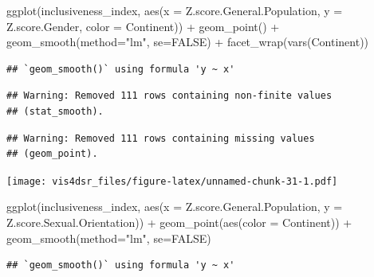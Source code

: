 \documentclass[
]{krantz}
\makeatletter
\newenvironment{Shaded}{\begin{snugshade}}{\end{snugshade}}
\newcommand{\AttributeTok}[1]{\textcolor[rgb]{0.61,0.61,0.61}{#1}}
\newcommand{\ConstantTok}[1]{\textcolor[rgb]{0,0,0}{#1}}
\newcommand{\FunctionTok}[1]{\textcolor[rgb]{0,0,0}{#1}}
\newcommand{\NormalTok}[1]{#1}
\newcommand{\SpecialCharTok}[1]{\textcolor[rgb]{0,0,0}{#1}}
\newcommand{\StringTok}[1]{\textcolor[rgb]{0.5,0.5,0.5}{#1}}
\newenvironment{kframe}{%
\medskip{}
\setlength{\fboxsep}{.8em}
 \def\at@end@of@kframe{}%
 \ifinner\ifhmode%
  \def\at@end@of@kframe{\end{minipage}}%
  \begin{minipage}{\columnwidth}%
 \fi\fi%
 \def\FrameCommand##1{\hskip\@totalleftmargin \hskip-\fboxsep
 \colorbox{shadecolor}{##1}\hskip-\fboxsep
     \hskip-\linewidth \hskip-\@totalleftmargin \hskip\columnwidth}%
 \MakeFramed {\advance\hsize-\width
   \@totalleftmargin\z@ \linewidth\hsize
   \@setminipage}}%
 {\par\unskip\endMakeFramed%
 \at@end@of@kframe}
\renewenvironment{Shaded}{\begin{kframe}}{\end{kframe}}
\makeatother
\begin{document}
\begin{Shaded}
\begin{Highlighting}[]
\FunctionTok{ggplot}\NormalTok{(inclusiveness\_index, }
       \FunctionTok{aes}\NormalTok{(}\AttributeTok{x =}\NormalTok{ Z.score.General.Population, }
           \AttributeTok{y =}\NormalTok{ Z.score.Gender,}
           \AttributeTok{color =}\NormalTok{ Continent)) }\SpecialCharTok{+}
  \FunctionTok{geom\_point}\NormalTok{() }\SpecialCharTok{+}
  \FunctionTok{geom\_smooth}\NormalTok{(}\AttributeTok{method=}\StringTok{"lm"}\NormalTok{, }\AttributeTok{se=}\ConstantTok{FALSE}\NormalTok{) }\SpecialCharTok{+} 
  \FunctionTok{facet\_wrap}\NormalTok{(}\FunctionTok{vars}\NormalTok{(Continent))}
\end{Highlighting}
\end{Shaded}

\begin{verbatim}
## `geom_smooth()` using formula 'y ~ x'
\end{verbatim}

\begin{verbatim}
## Warning: Removed 111 rows containing non-finite values
## (stat_smooth).
\end{verbatim}

\begin{verbatim}
## Warning: Removed 111 rows containing missing values
## (geom_point).
\end{verbatim}

\texttt{[image: vis4dsr\_files/figure-latex/unnamed-chunk-31-1.pdf]}

\begin{Shaded}
\begin{Highlighting}[]
\FunctionTok{ggplot}\NormalTok{(inclusiveness\_index, }
       \FunctionTok{aes}\NormalTok{(}\AttributeTok{x =}\NormalTok{ Z.score.General.Population, }
           \AttributeTok{y =}\NormalTok{ Z.score.Sexual.Orientation)) }\SpecialCharTok{+}
  \FunctionTok{geom\_point}\NormalTok{(}\FunctionTok{aes}\NormalTok{(}\AttributeTok{color =}\NormalTok{ Continent)) }\SpecialCharTok{+}
  \FunctionTok{geom\_smooth}\NormalTok{(}\AttributeTok{method=}\StringTok{"lm"}\NormalTok{, }\AttributeTok{se=}\ConstantTok{FALSE}\NormalTok{)}
\end{Highlighting}
\end{Shaded}

\begin{verbatim}
## `geom_smooth()` using formula 'y ~ x'
\end{verbatim}
\end{document}
